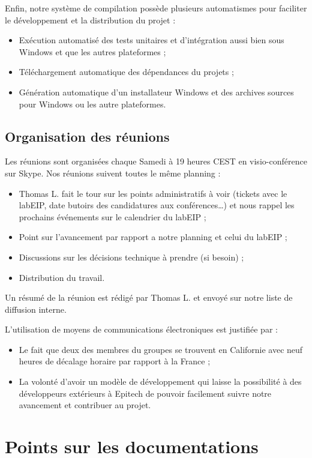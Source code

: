 \documentclass[francais]{rtxreport}
\begin{document}
Enfin, notre système de compilation possède plusieurs automatismes pour
faciliter le développement et la distribution du projet :
\begin{itemize}
\item Exécution automatisé des tests unitaires et d'intégration aussi bien sous
  Windows et que les autres plateformes ;
\item Téléchargement automatique des dépendances du projets ;
\item Génération automatique d'un installateur Windows et des archives sources
  pour Windows ou les autre plateformes.
\end{itemize}

\section{Organisation des réunions}

Les réunions sont organisées chaque Samedi à 19 heures CEST en visio-conférence
sur Skype. Nos réunions suivent toutes le même planning :
\begin{itemize}
\item Thomas L. fait le tour sur les points administratifs à voir (tickets avec
  le labEIP, date butoirs des candidatures aux conférences\ldots) et nous rappel
  les prochains événements sur le calendrier du labEIP ;
\item Point sur l'avancement par rapport a notre planning et celui du labEIP ;
\item Discussions sur les décisions technique à prendre (si besoin) ;
\item Distribution du travail.
\end{itemize}

Un résumé de la réunion est rédigé par Thomas L. et envoyé sur notre liste de
diffusion interne.

L'utilisation de moyens de communications électroniques est justifiée par :
\begin{itemize}
\item Le fait que deux des membres du groupes se trouvent en Californie avec
  neuf heures de décalage horaire par rapport à la France ;
\item La volonté d'avoir un modèle de développement qui laisse la possibilité à
  des développeurs extérieurs à Epitech de pouvoir facilement suivre notre
  avancement et contribuer au projet.
\end{itemize}

\chapter{Points sur les documentations}
\end{document}
